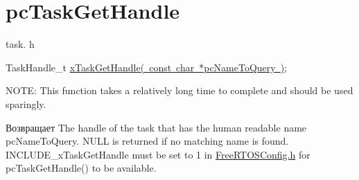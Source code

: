 \hypertarget{group__pc_task_get_handle}{}\section{pc\+Task\+Get\+Handle}
\label{group__pc_task_get_handle}
task. h 
\begin{DoxyPre}TaskHandle\_t \mbox{\hyperlink{task_8h_a45b3b1cd0227269609499beeeb8c5c26}{xTaskGetHandle( const char *pcNameToQuery )}};\end{DoxyPre}


N\+O\+TE\+: This function takes a relatively long time to complete and should be used sparingly.

\begin{DoxyReturn}{Возвращает}
The handle of the task that has the human readable name pc\+Name\+To\+Query. N\+U\+LL is returned if no matching name is found. I\+N\+C\+L\+U\+D\+E\+\_\+x\+Task\+Get\+Handle must be set to 1 in \mbox{\hyperlink{_free_r_t_o_s_config_8h}{Free\+R\+T\+O\+S\+Config.\+h}} for pc\+Task\+Get\+Handle() to be available. 
\end{DoxyReturn}
